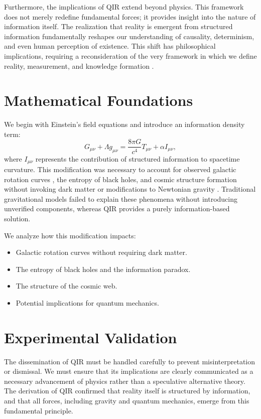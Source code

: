 \documentclass{article}
\begin{document}
Furthermore, the implications of QIR extend beyond physics. This framework does not merely redefine fundamental forces; it provides insight into the nature of information itself. The realization that reality is emergent from structured information fundamentally reshapes our understanding of causality, determinism, and even human perception of existence. This shift has philosophical implications, requiring a reconsideration of the very framework in which we define reality, measurement, and knowledge formation \cite{wheeleritfrombit}.

\section{Mathematical Foundations}
We begin with Einstein’s field equations \cite{einstein} and introduce an information density term:
\begin{equation}
    G_{\mu\nu} + \Lambda g_{\mu\nu} = \frac{8 \pi G}{c^4} T_{\mu\nu} + \alpha I_{\mu\nu},
\end{equation}
where $I_{\mu\nu}$ represents the contribution of structured information to spacetime curvature. This modification was necessary to account for observed galactic rotation curves \cite{sparc}, the entropy of black holes, and cosmic structure formation without invoking dark matter or modifications to Newtonian gravity \cite{verlindegravity, bekensteinentropy}. Traditional gravitational models failed to explain these phenomena without introducing unverified components, whereas QIR provides a purely information-based solution.

We analyze how this modification impacts:
\begin{itemize}
    \item Galactic rotation curves without requiring dark matter.
    \item The entropy of black holes and the information paradox.
    \item The structure of the cosmic web.
    \item Potential implications for quantum mechanics.
\end{itemize}

\section{Experimental Validation}
The dissemination of QIR must be handled carefully to prevent misinterpretation or dismissal. We must ensure that its implications are clearly communicated as a necessary advancement of physics rather than a speculative alternative theory. The derivation of QIR confirmed that reality itself is structured by information, and that all forces, including gravity and quantum mechanics, emerge from this fundamental principle.
\end{document}
